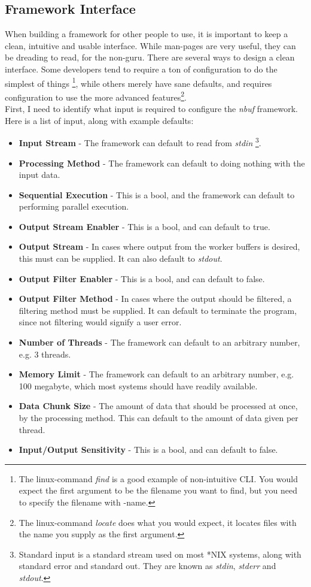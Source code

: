 \documentclass[a4paper]{article}
\newcommand{\nbuf}{\textit{nbuf} }
\begin{document}
\subsection{Framework Interface}
When building a framework for other people to use, it is important to keep a clean, intuitive and usable interface. While man-pages are very useful, they can be dreading to read, for the non-guru. There are several ways to design a clean interface. Some developers tend to require a ton of configuration to do the simplest of things \footnote{The linux-command \textit{find} is a good example of non-intuitive CLI. You would expect the first argument to be the filename you want to find, but you need to specify the filename with -name.}, while others merely have sane defaults, and requires configuration to use the more advanced features\footnote{The linux-command \textit{locate} does what you would expect, it locates files with the name you supply as the first argument.}.\\

First, I need to identify what input is required to configure the \nbuf framework. Here is a list of input, along with example defaults:
\begin{itemize}
\item \textbf{Input Stream} - The framework can default to read from \textit{stdin} \footnote{Standard input is a standard stream used on most *NIX systems, along with standard error and standard out. They are known as \textit{stdin}, \textit{stderr} and \textit{stdout}.}.
\item \textbf{Processing Method} - The framework can default to doing nothing with the input data.
\item \textbf{Sequential Execution} - This is a bool, and the framework can default to performing parallel execution.
\item \textbf{Output Stream Enabler} - This is a bool, and can default to true.
\item \textbf{Output Stream} - In cases where output from the worker buffers is desired, this must can be supplied. It can also default to \textit{stdout}.
\item \textbf{Output Filter Enabler} - This is a bool, and can default to false.
\item \textbf{Output Filter Method} - In cases where the output should be filtered, a filtering method must be supplied. It can default to terminate the program, since not filtering would signify a user error.
\item \textbf{Number of Threads} - The framework can default to an arbitrary number, e.g. 3 threads.
\item \textbf{Memory Limit} - The framework can default to an arbitrary number, e.g. 100 megabyte, which most systems should have readily available.
\item \textbf{Data Chunk Size} - The amount of data that should be processed at once, by the processing method. This can default to the amount of data given per thread.
\item \textbf{Input/Output Sensitivity} - This is a bool, and can default to false.
\end{itemize}
\end{document}
